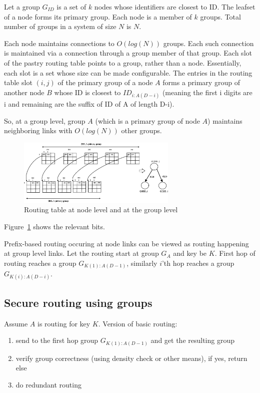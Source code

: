 Let a group $G_{ID}$ is a set of $k$ nodes whose identifiers are closest to ID.  
The leafset of a node forms its primary group. Each node is a member of $k$ groups. Total number of groups in a system of size $N$ is $N$. 
 
Each node maintains connections to $O(log(N))$ groups. Each such connection is maintained via a connection through a group member of that group. Each slot of the pastry routing table points to a group, rather than a node. Essentially, each slot is a set whose size can be made configurable. The entries in the routing table slot $(i,j)$ of the primary group of a node $A$ forms a primary group of another node $B$ whose ID is closest to $ID_{i:A(D-i)}$ (meaning the first i digits are i and remaining are the suffix of ID of A of length D-i).  
 
So, at a group level, group $A$ (which is a primary group of node $A$) maintains neighboring links with $O(log(N))$ other groups. 
 
\begin{figure} 
\begin{center} 
\includegraphics[width=3in]{group-routing-table.eps} 
\end{center} 
\caption{Routing table at node level and at the group level} 
\label{group-routing-table} 
\end{figure} 
 
 
Figure~\ref{group-routing-table} shows the relevant bits. 
 
Prefix-based routing occuring at node links can be viewed as routing happening at group level links. Let the routing start at group $G_{A}$ and key be $K$. First hop of routing reaches a group $G_{K(1):A(D-1)}$, similarly $i$'th hop reaches a group $G_{K(i):A(D-i)}$.  
 
\subsection{Secure routing using groups} 
Assume $A$ is routing for key $K$. 
Version of basic routing: 
\begin{enumerate} 
\item{} send to the first hop group $G_{K(1):A(D-1)}$ and get the resulting group 
\item{} verify group correctness (using density check or other means), if yes, return else  
\item{} do redundant routing 
\end{enumerate} 
 
